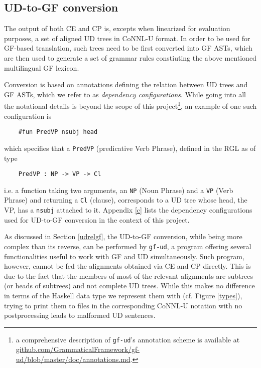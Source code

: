 \subsection{UD-to-GF conversion}
The output of both CE and CP is, excepts when linearized for evaluation purposes, a set of aligned UD trees in CoNNL-U format. 
In order to be used for GF-based translation, such trees need to be first converted into GF ASTs, which are then used to generate a set of grammar rules constiuting the above mentioned multilingual GF lexicon. \smallskip

Conversion is based on annotations defining the relation between UD trees and GF ASTs, which we refer to as \textit{dependency configurations}. 
While going into all the notational details is beyond the scope of this project\footnote{a comprehensive description of \texttt{gf-ud}'s annotation scheme is available at \url{github.com/GrammaticalFramework/gf-ud/blob/master/doc/annotations.md}.}, an example of one such configuration is 

\begin{verbatim}
    #fun PredVP	nsubj head
\end{verbatim}

which specifies that a \texttt{PredVP} (predicative Verb Phrase), defined in the RGL as of type

\begin{verbatim}
    PredVP : NP -> VP -> Cl
\end{verbatim}

i.e. a function taking two arguments, an \texttt{NP} (Noun Phrase) and a \texttt{VP} (Verb Phrase) and returning a \texttt{Cl} (clause), corresponds to a UD tree whose head, the VP, has a \texttt{nsubj} attached to it. Appendix \ref{c} lists the dependency configurations used for UD-to-GF conversion in the context of this project.
\smallskip

As discussed in Section \ref{udrelgf}, the UD-to-GF conversion, while being more complex than its reverse, can be performed by \texttt{gf-ud}, a program offering several functionalities useful to work with GF and UD simultaneously.
Such program, however, cannot be fed the alignments obtained via CE and CP directly. 
This is due to the fact that the members of most of the relevant alignments are subtrees (or heads of subtrees) and not complete UD trees. 
While this makes no difference in terms of the Haskell data type we represent them with (cf. Figure \ref{types}), trying to print them to files in the corresponding CoNNL-U notation with no postprocessing leads to malformed UD sentences. \smallskip

